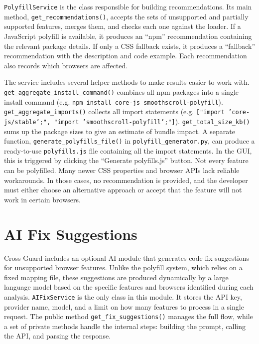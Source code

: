 \texttt{PolyfillService} is the class responsible for building recommendations. Its main method, \texttt{get\_recommendations()}, accepts the sets of unsupported and partially supported features, merges them, and checks each one against the loader. If a JavaScript polyfill is available, it produces an ``npm'' recommendation containing the relevant package details. If only a CSS fallback exists, it produces a ``fallback'' recommendation with the description and code example. Each recommendation also records which browsers are affected.

The service includes several helper methods to make results easier to work with. \texttt{get\_aggregate\_install\_command()} combines all npm packages into a single install command (e.g. \texttt{npm install core-js smoothscroll-polyfill}). \texttt{get\_aggregate\_imports()} collects all import statements (e.g. \texttt{["import 'core-js/stable';", "import 'smoothscroll-polyfill';"]}). \texttt{get\_total\_size\_kb()} sums up the package sizes to give an estimate of bundle impact. A separate function, \texttt{generate\_polyfills\_file()} in \texttt{polyfill\_generator.py}, can produce a ready-to-use \texttt{polyfills.js} file containing all the import statements. In the GUI, this is triggered by clicking the ``Generate polyfills.js'' button. Not every feature can be polyfilled. Many newer CSS properties and browser APIs lack reliable workarounds. In those cases, no recommendation is provided, and the developer must either choose an alternative approach or accept that the feature will not work in certain browsers.

\section{AI Fix Suggestions}
\label{sec:ai-fixes}

Cross Guard includes an optional AI module that generates code fix suggestions for unsupported browser features. Unlike the polyfill system, which relies on a fixed mapping file, these suggestions are produced dynamically by a large language model based on the specific features and browsers identified during each analysis. \texttt{AIFixService} is the only class in this module. It stores the API key, provider name, model, and a limit on how many features to process in a single request. The public method \texttt{get\_fix\_suggestions()} manages the full flow, while a set of private methods handle the internal steps: building the prompt, calling the API, and parsing the response.

